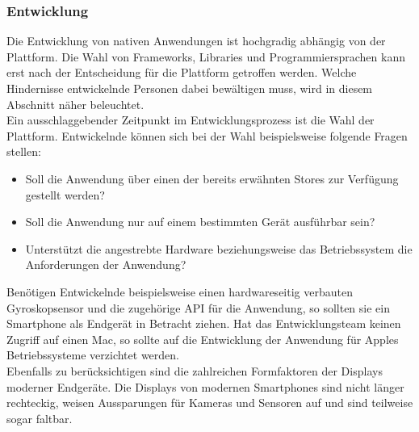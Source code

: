 \documentclass[a4paper]{scrartcl}
\begin{document}
\subsubsection{Entwicklung}

Die Entwicklung von nativen Anwendungen ist hochgradig abhängig von der Plattform. Die Wahl von Frameworks, Libraries und Programmiersprachen kann erst nach der Entscheidung für die Plattform getroffen werden. Welche Hindernisse entwickelnde Personen dabei bewältigen muss, wird in diesem Abschnitt näher beleuchtet. \\
Ein ausschlaggebender Zeitpunkt im Entwicklungsprozess ist die Wahl der Plattform. Entwickelnde können sich bei der Wahl beispielsweise folgende Fragen stellen: 

\begin{itemize}
	\item Soll die Anwendung über einen der bereits erwähnten Stores zur Verfügung gestellt werden?
	\item Soll die Anwendung nur auf einem bestimmten Gerät ausführbar sein?
	\item Unterstützt die angestrebte Hardware beziehungsweise das Betriebssystem die Anforderungen der Anwendung?
\end{itemize}

Benötigen Entwickelnde beispielsweise einen hardwareseitig verbauten Gyroskopsensor und die zugehörige API für die Anwendung, so sollten sie ein Smartphone als Endgerät in Betracht ziehen. Hat das Entwicklungsteam keinen Zugriff auf einen Mac, so sollte auf die Entwicklung der Anwendung für Apples Betriebssysteme verzichtet werden. \\
Ebenfalls zu berücksichtigen sind die zahlreichen Formfaktoren der Displays moderner Endgeräte. Die Displays von modernen Smartphones sind nicht länger rechteckig, weisen Aussparungen für Kameras und Sensoren auf und sind teilweise sogar faltbar.
\end{document}
